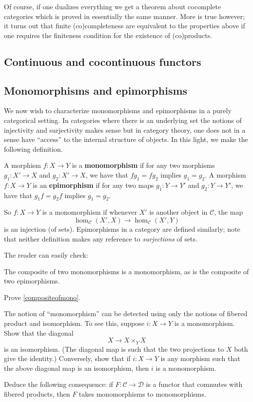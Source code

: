Of course, if one dualizes everything we get a theorem about cocomplete
categories which is proved in essentially the same manner. More is true
however; it turns out that finite (co)completeness are equivalent to the
properties above if one requires the finiteness condition for the existence of
(co)products.

\subsection{Continuous and cocontinuous functors}
\subsection{Monomorphisms and epimorphisms}
We now wish to characterize monomorphisms and epimorphisms in a purely
categorical setting. In categories where there is an underlying set the notions
of injectivity and surjectivity makes sense but in category theory, one
does not
in a sense have ``access'' to the internal structure of objects. In this light,
we make the following definition.

\begin{definition}
A morphism $f:X \to Y$ is a \textbf{monomorphism} if for any two morphisms
$g_1:X'\rightarrow X$ and $g_2:X'\rightarrow X$, we have that $f g_1 = f g_2$
implies $g_1=g_2$. A morphism $f:X\rightarrow Y$ is an \textbf{epimorphism} if for any two
maps $g_1:Y\rightarrow Y'$ and $g_2:Y\rightarrow Y'$, we have that $g_1 f = g_2
f$ implies $g_1 = g_2$.
\end{definition}

So $f: X \to Y$ is a monomorphism if whenever $X'$ is another object in
$\mathcal{C}$, the map
\[ \hom_{\mathcal{C}}(X', X) \to \hom_{\mathcal{C}}(X', Y)  \]
is an injection (of sets). Epimorphisms in a category are defined similarly;
note that neither definition makes any reference to \emph{surjections} of sets.


The reader can easily check:

\begin{proposition}  \label{compositeofmono}
The composite of two monomorphisms is a monomorphism, as is the composite of
two epimorphisms.
\end{proposition} 

\begin{exercise} 
Prove \cref{compositeofmono}. 
\end{exercise} 


\begin{exercise} 
The notion of ``monomorphism'' can be detected using only the notions of
fibered product and isomorphism. To see this, suppose $i: X \to Y$ is a
monomorphism. Show that the diagonal
\[ X \to X \times_Y X  \]
is an isomorphism. (The diagonal map is such that the two
projections to $X$ both give the identity.) Conversely, show that if $i: X \to Y$ is any morphism such
that the above diagonal map is an isomorphism, then $i$ is a monomorphism.

Deduce the following consequence: if $F: \mathcal{C} \to \mathcal{D}$ is a
functor that commutes with fibered products, then $F $ takes monomorphisms to
monomorphisms.
\end{exercise} 


